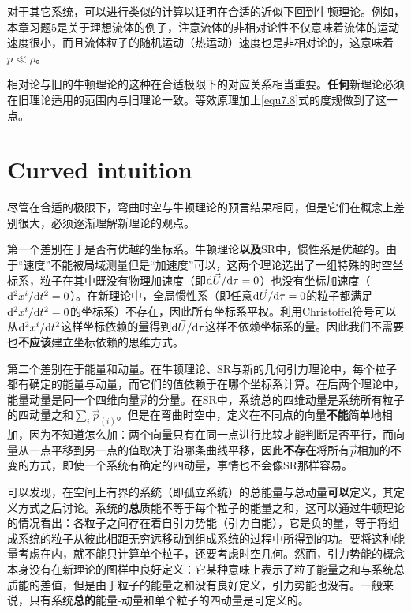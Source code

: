 对于其它系统，可以进行类似的计算以证明在合适的近似下回到牛顿理论。例如，本章习题5是关于理想流体的例子，注意流体的非相对论性不仅意味着流体的运动速度很小，而且流体粒子的随机运动（热运动）速度也是非相对论的，这意味着$p \ll \rho$。

相对论与旧的牛顿理论的这种在合适极限下的对应关系相当重要。\textbf{任何}新理论必须在旧理论适用的范围内与旧理论一致。等效原理加上\eqref{equ7.8}式的度规做到了这一点。

\section{Curved intuition}
\label{sec7.3}
尽管在合适的极限下，弯曲时空与牛顿理论的预言结果相同，但是它们在概念上差别很大，必须逐渐理解新理论的观点。

第一个差别在于是否有优越的坐标系。牛顿理论\textbf{以及}SR中，惯性系是优越的。由于“速度”不能被局域测量但是“加速度”可以，这两个理论选出了一组特殊的时空坐标系，粒子在其中既没有物理加速度（即$\mathrm{d} \vec{U} / \mathrm{d} \tau = 0$）也没有坐标加速度（$\mathrm{d}^2 x^i / \mathrm{d} t^2 = 0$）。在新理论中，全局惯性系（即任意$\mathrm{d} \vec{U} / \mathrm{d} \tau = 0$的粒子都满足$\mathrm{d}^2 x^i / \mathrm{d} t^2 = 0$的坐标系）不存在，因此所有坐标系平权。利用Christoffel符号可以从$\mathrm{d}^2 x^i / \mathrm{d} t^2$这样坐标依赖的量得到$\mathrm{d} \vec{U} / \mathrm{d} \tau$这样不依赖坐标系的量。因此我们不需要也\textbf{不应该}建立坐标依赖的思维方式。

第二个差别在于能量和动量。在牛顿理论、SR与新的几何引力理论中，每个粒子都有确定的能量与动量，而它们的值依赖于在哪个坐标系计算。在后两个理论中，能量动量是同一个四维向量$\vec{p}$的分量。在SR中，系统总的四维动量是系统所有粒子的四动量之和$\sum_i \vec{p}_{(i)}$。但是在弯曲时空中，定义在不同点的向量\textbf{不能}简单地相加，因为不知道怎么加：两个向量只有在同一点进行比较才能判断是否平行，而向量从一点平移到另一点的值取决于沿哪条曲线平移，因此\textbf{不存在}将所有$\vec{p}$相加的不变的方式，即使一个系统有确定的四动量，事情也不会像SR那样容易。

可以发现，在空间上有界的系统（即孤立系统）的总能量与总动量\textbf{可以}定义，其定义方式之后讨论。系统的\textbf{总}质能不等于每个粒子的能量之和，这可以通过牛顿理论的情况看出：各粒子之间存在着自引力势能（引力自能），它是负的量，等于将组成系统的粒子从彼此相距无穷远移动到组成系统的过程中所得到的功。要将这种能量考虑在内，就不能只计算单个粒子，还要考虑时空几何。然而，引力势能的概念本身没有在新理论的图样中良好定义：它某种意味上表示了粒子能量之和与系统总质能的差值，但是由于粒子的能量之和没有良好定义，引力势能也没有。一般来说，只有系统\textbf{总的}能量-动量和单个粒子的四动量是可定义的。


